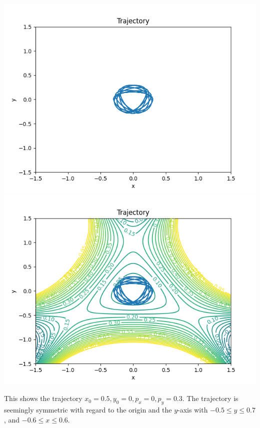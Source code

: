 \documentclass{article}
\begin{document}
	\includegraphics[scale=0.5]{./Trajectory.png} \includegraphics[scale=0.5]{./Trajectory_with_contour.png}

	This shows the trajectory $x_0 = 0.5, y_0 = 0, p_x = 0, p_y = 0.3$. The trajectory is seemingly symmetric with
	regard to the origin and the $y$-axis with $-0.5\le y \le 0.7$, and $-0.6 \le x \le 0.6$.
\end{document}
